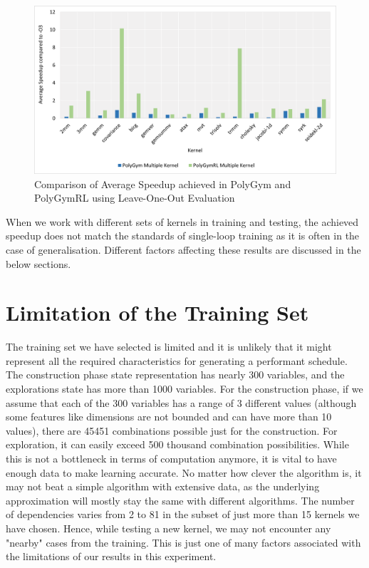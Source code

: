 \documentclass[logo,msc]{infthesis}           %
\begin{document}
\begin{figure}[htbp]
  \centering
  \includegraphics[width=\textwidth]{Images/Chart_Multiple_PolyGym_PolyGymRL.png}    
  \caption{Comparison of Average Speedup achieved in PolyGym and PolyGymRL using Leave-One-Out Evaluation}
  \label{fig:multi_PolyGym_PolyGymRL}
\end{figure}
 
When we work with different sets of kernels in training and testing, the achieved speedup does not match the standards of single-loop training as it is often in the case of generalisation. Different factors affecting these results are discussed in the below sections.

\section{Limitation of the Training Set}
The training set we have selected is limited and it is unlikely that it might represent all the required characteristics for generating a performant schedule. The construction phase state representation has nearly 300 variables, and the explorations state has more than 1000 variables. For the construction phase, if we assume that each of the 300 variables has a range of 3 different values (although some features like dimensions are not bounded and can have more than 10 values), there are 45451 combinations possible just for the construction. For exploration, it can easily exceed 500 thousand combination possibilities. While this is not a bottleneck in terms of computation anymore, it is vital to have enough data to make learning accurate. No matter how clever the algorithm is, it may not beat a simple algorithm with extensive data, as the underlying approximation will mostly stay the same with different algorithms. The number of dependencies varies from 2 to 81 in the subset of just more than 15 kernels we have chosen. Hence, while testing a new kernel, we may not encounter any "nearby" cases from the training. This is just one of many factors associated with the limitations of our results in this experiment. 
\end{document}
